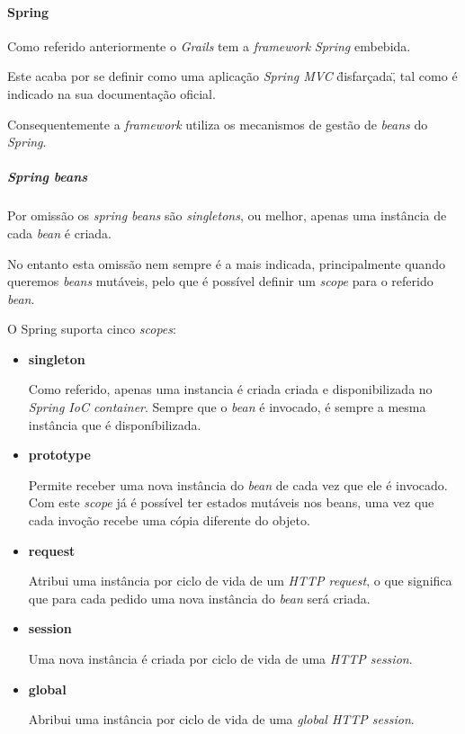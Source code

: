 \paragraph{Spring}

  Como referido anteriormente o \textit{Grails} tem a \textit{framework} \textit{Spring} embebida. 

  Este acaba por se definir como uma aplicação \textit{Spring MVC} \"disfarçada\", tal como é indicado na sua documentação oficial.

  Consequentemente a \textit{framework} utiliza os mecanismos de gestão de \textit{beans} do \textit{Spring}.

  \subparagraph{Spring beans}
  
  Por omissão os \textit{spring beans} são \textit{singletons}, ou melhor, apenas uma instância de cada \textit{bean} é criada.

  No entanto esta omissão nem sempre é a mais indicada, principalmente quando queremos \textit{beans} mutáveis, pelo que é possível definir um \textit{scope} para o referido \textit{bean}.  

  O Spring suporta cinco \textit{scopes}:

  \begin{itemize}
    \item \textbf{singleton}

      Como referido, apenas uma instancia é criada criada e disponibilizada no \textit{Spring IoC container}. Sempre que o \textit{bean} é invocado, é sempre a mesma instância que é disponíbilizada.

    \item \textbf{prototype}

      Permite receber uma nova instância do \textit{bean} de cada vez que ele é invocado. Com este \textit{scope} já é possível ter estados mutáveis nos beans, uma vez que cada invoção recebe uma cópia diferente do objeto.

    \item \textbf{request}

      Atribui uma instância por ciclo de vida de um \textit{HTTP request}, o que significa que para cada pedido uma nova instância do \textit{bean} será criada.

    \item \textbf{session}

      Uma nova instância é criada por ciclo de vida de uma \textit{HTTP session}.

    \item \textbf{global}

      Abribui uma instância por ciclo de vida de uma \textit{global HTTP session}.

  \end{itemize}

